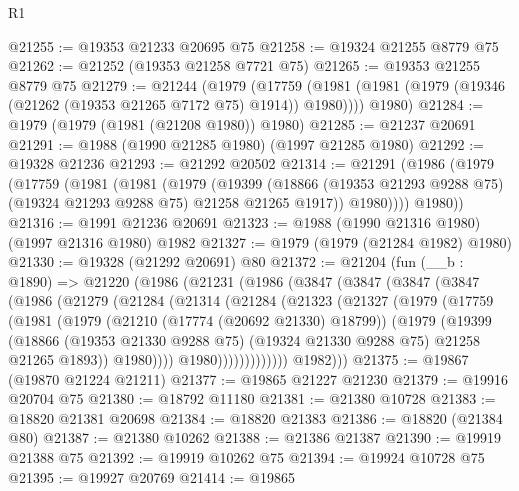 \begin{lexlean}{R1}
\begin{coremodule}
@21255 := @19353 @21233 @20695 @75
@21258 := @19324 @21255 @8779 @75
@21262 := @21252 (@19353 @21258 @7721 @75)
@21265 := @19353 @21255 @8779 @75
@21279 := @21244
    (@1979
      (@17759 (@1981 (@1981 (@1979 (@19346 (@21262 (@19353 @21265 @7172 @75) @1914)) @1980))))
      @1980)
@21284 := @1979 (@1979 (@1981 (@21208 @1980)) @1980)
@21285 := @21237 @20691
@21291 := @1988 (@1990 @21285 @1980) (@1997 @21285 @1980)
@21292 := @19328 @21236
@21293 := @21292 @20502
@21314 := @21291
    (@1986
      (@1979
        (@17759
          (@1981
            (@1981
              (@1979
                (@19399
                  (@18866 (@19353 @21293 @9288 @75) (@19324 @21293 @9288 @75) @21258 @21265 @1917))
                @1980))))
        @1980))
@21316 := @1991 @21236 @20691
@21323 := @1988 (@1990 @21316 @1980) (@1997 @21316 @1980) @1982
@21327 := @1979 (@1979 (@21284 @1982) @1980)
@21330 := @19328 (@21292 @20691) @80
@21372 := @21204
    (fun (__b : @1890) =>
    @21220
      (@1986
        (@21231
          (@1986
            (@3847
              (@3847
                (@3847
                  (@3847
                    (@1986
                      (@21279
                        (@21284
                          (@21314
                            (@21284
                              (@21323
                                (@21327
                                  (@1979
                                    (@17759
                                      (@1981
                                        (@1979
                                          (@21210 (@17774 (@20692 @21330) @18799))
                                          (@1979
                                            (@19399
                                              (@18866
                                                (@19353 @21330 @9288 @75)
                                                (@19324 @21330 @9288 @75)
                                                @21258
                                                @21265
                                                @1893))
                                            @1980))))
                                    @1980)))))))))))))
          @1982)))
@21375 := @19867 (@19870 @21224 @21211)
@21377 := @19865 @21227 @21230
@21379 := @19916 @20704 @75
@21380 := @18792 @11180
@21381 := @21380 @10728
@21383 := @18820 @21381 @20698
@21384 := @18820 @21383
@21386 := @18820 (@21384 @80)
@21387 := @21380 @10262
@21388 := @21386 @21387
@21390 := @19919 @21388 @75
@21392 := @19919 @10262 @75
@21394 := @19924 @10728 @75
@21395 := @19927 @20769
@21414 := @19865

\end{coremodule}
\end{lexlean}
